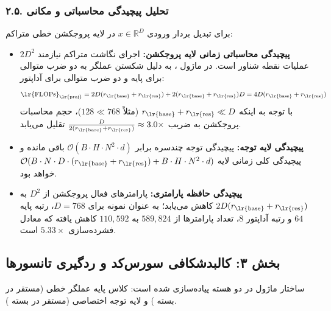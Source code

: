 \subsubsection*{۲.۵. تحلیل پیچیدگی محاسباتی و مکانی}
برای تبدیل بردار ورودی $x \in \mathbb{R}^{D}$ در لایه پروجکشن خطی متراکم:
\begin{itemize}
    \item \textbf{پیچیدگی محاسباتی زمانی لایه پروجکشن:} اجرای نگاشت متراکم نیازمند $2 D^2$ عملیات نقطه شناور  است. در ماژول ، به دلیل شکستن عملگر به دو ضرب متوالی برای پایه و دو ضرب متوالی برای آداپتور:
    \begin{equation}
    \text{\lr{FLOPs}}_{\text{\lr{proj}}} = 2 D (r_{\text{\lr{base}}} + r_{\text{\lr{res}}}) + 2 (r_{\text{\lr{base}}} + r_{\text{\lr{res}}}) D = 4 D (r_{\text{\lr{base}}} + r_{\text{\lr{res}}})
    \end{equation}
    با توجه به اینکه $r_{\text{\lr{base}}} + r_{\text{\lr{res}}} \ll D$ (مثلاً $128 \ll 768$)، حجم محاسبات پروجکشن به ضریب $\frac{D}{2(r_{\text{\lr{base}}} + r_{\text{\lr{res}}})} \approx 3.0\times$ تقلیل می‌یابد.
    \item \textbf{پیچیدگی لایه توجه:} پیچیدگی توجه چندسره برابر $\mathcal{O}(B \cdot H \cdot N^2 \cdot d)$ باقی مانده و پیچیدگی کلی زمانی لایه $\mathcal{O}(B \cdot N \cdot D \cdot (r_{\text{\lr{base}}} + r_{\text{\lr{res}}}) + B \cdot H \cdot N^2 \cdot d)$ خواهد بود.
    \item \textbf{پیچیدگی حافظه پارامتری:} پارامترهای فعال پروجکشن از $D^2$ به $2 D (r_{\text{\lr{base}}} + r_{\text{\lr{res}}})$ کاهش می‌یابد؛ به عنوان نمونه برای $D = 768$، رتبه پایه $64$ و رتبه آداپتور $8$، تعداد پارامترها از $589,824$ به $110,592$ کاهش یافته که معادل فشرده‌سازی $5.33\times$ است.
\end{itemize}

\subsection*{بخش ۳: کالبدشکافی سورس‌کد و ردگیری تانسورها }
ساختار ماژول  در دو هسته پیاده‌سازی شده است: کلاس پایه عملگر خطی  (مستقر در بسته ) و لایه توجه اختصاصی  (مستقر در بسته ).

